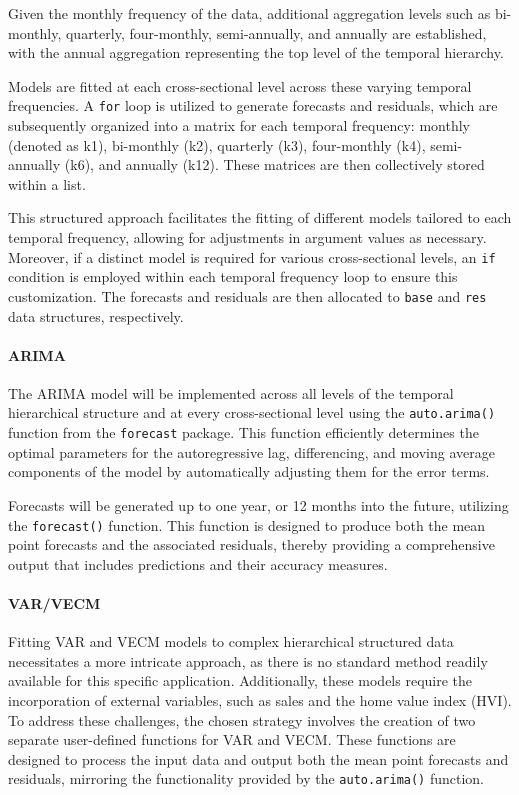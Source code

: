 \documentclass[11pt,a4paper,]{article}
\begin{document}
Given the monthly frequency of the data, additional aggregation levels such as bi-monthly, quarterly, four-monthly, semi-annually, and annually are established, with the annual aggregation representing the top level of the temporal hierarchy.

Models are fitted at each cross-sectional level across these varying temporal frequencies. A \texttt{for} loop is utilized to generate forecasts and residuals, which are subsequently organized into a matrix for each temporal frequency: monthly (denoted as k1), bi-monthly (k2), quarterly (k3), four-monthly (k4), semi-annually (k6), and annually (k12). These matrices are then collectively stored within a list.

This structured approach facilitates the fitting of different models tailored to each temporal frequency, allowing for adjustments in argument values as necessary. Moreover, if a distinct model is required for various cross-sectional levels, an \texttt{if} condition is employed within each temporal frequency loop to ensure this customization. The forecasts and residuals are then allocated to \texttt{base} and \texttt{res} data structures, respectively.

\paragraph{ARIMA}\label{arima}

The ARIMA model will be implemented across all levels of the temporal hierarchical structure and at every cross-sectional level using the \texttt{auto.arima()} function from the \texttt{forecast} package. This function efficiently determines the optimal parameters for the autoregressive lag, differencing, and moving average components of the model by automatically adjusting them for the error terms.

Forecasts will be generated up to one year, or 12 months into the future, utilizing the \texttt{forecast()} function. This function is designed to produce both the mean point forecasts and the associated residuals, thereby providing a comprehensive output that includes predictions and their accuracy measures.

\paragraph{VAR/VECM}\label{varvecm}

Fitting VAR and VECM models to complex hierarchical structured data necessitates a more intricate approach, as there is no standard method readily available for this specific application. Additionally, these models require the incorporation of external variables, such as sales and the home value index (HVI). To address these challenges, the chosen strategy involves the creation of two separate user-defined functions for VAR and VECM. These functions are designed to process the input data and output both the mean point forecasts and residuals, mirroring the functionality provided by the \texttt{auto.arima()} function.
\end{document}
